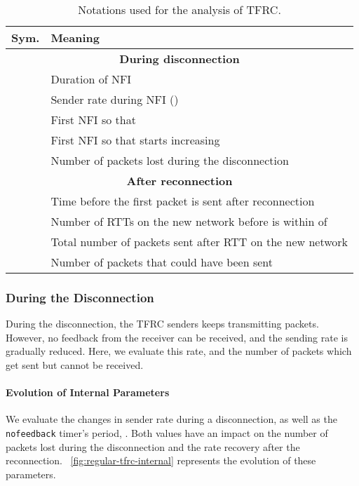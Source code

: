 \documentclass[twocolumn]{nictatechreport}
\begin{document}
\begin{table}[tb]
  \centering

  \caption[Notations for TFRC modelling]{Notations used for the analysis of
  TFRC.}

  \label{tab:notations}
  \addtolength{\tabcolsep}{-1ex}
  \begin{tabular}{cp{7.5cm}}
    \toprule
    \textbf{Sym.} & \hfill\textbf{Meaning}\hfill\strut \\
    \midrule
    \multicolumn{2}{c}{\textbf{During disconnection}} \\
    \cmidrule{1-2}
     & Duration of NFI  \\
     & Sender rate during NFI  () \\
     & First NFI so that  \\
     & First NFI so that  starts increasing \\
     & Number of packets lost during the disconnection \\
    \cmidrule{1-2}
    \multicolumn{2}{c}{\textbf{After reconnection}} \\
    \cmidrule{1-2}
 & Time before the first packet is sent after reconnection\\
 & Number of RTTs on the new network before  is within  of  \\
     & Total number of packets sent after RTT  on the new network \\
 & Number of packets that could have been sent \\
    \bottomrule
  \end{tabular}
\end{table}

\subsubsection{During the Disconnection}

During the disconnection, the TFRC senders keeps transmitting packets. However,
no feedback from the receiver can be received, and the sending rate is
gradually reduced. Here, we evaluate this rate, and the number of packets which
get sent but cannot be received.

\paragraph{Evolution of Internal Parameters} We evaluate the changes in sender
rate  during a disconnection, as well as the \verb#nofeedback# timer's
period, . Both values have an impact on the number of packets
lost during the disconnection and the rate recovery after the reconnection.
\figurename~\ref{fig:regular-tfrc-internal} represents the evolution of these
parameters.
\end{document}
